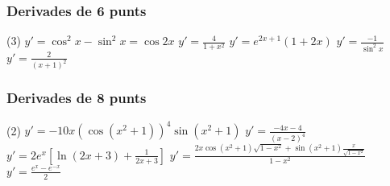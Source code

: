 \subsubsection*{Derivades de 6 punts}
\begin{tasks}(3)
	\task $y'= \cos^2 x - \sin^2 x = \cos 2x$
	\task $y'= \frac{4}{1+x^2}$
	\task $y'=e^{2x+1} \left( 1 + 2x \right)$
	\task $y'=\frac{-1}{\sin^2 x}$
	\task $y'=\frac{2}{(x+1)^2}$
\end{tasks}
\subsubsection*{Derivades de 8 punts}
\begin{tasks}(2)
	\task $y'=-10x (\cos(x^2+1))^4 \sin (x^2+1)$
	\task $y'=\frac{-4x-4}{(x-2)^4}$
	\task $y'=2 e^x \left[ \ln(2x+3) + \frac{1}{2x+3}\right]$
	\task $y'=\frac{2x\cos(x^2+1)\sqrt{1-x^2}+\sin(x^2+1)\frac{x}{\sqrt{1-x^2}}}{1-x^2}$
	\task $y'=\frac{e^x - e^{-x}}{2}$
\end{tasks}




